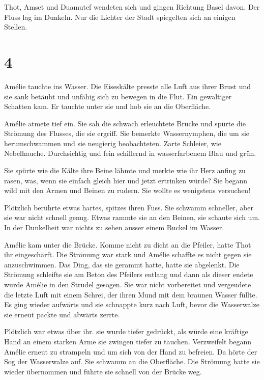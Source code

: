 \documentclass[11pt,titlepage,a5paper]{book}
\begin{document}
Thot, Amset und Duamutef wendeten sich und gingen Richtung Basel davon. Der Fluss lag im Dunkeln. Nur die Lichter der Stadt spiegelten sich an einigen Stellen.

\section*{4}

Amélie tauchte ins Wasser. Die Eiseskälte presste alle Luft aus ihrer Brust und sie sank betäubt und unfähig sich zu bewegen in die Flut. Ein gewaltiger Schatten kam. Er tauchte unter sie und hob sie an die Oberfläche.

Amélie atmete tief ein. Sie sah die schwach erleuchtete Brücke und spürte die Strömung des Flusses, die sie ergriff. Sie bemerkte Wassernymphen, die um sie herumschwammen und sie neugierig beobachteten. Zarte Schleier, wie Nebelhauche. Durchsichtig und fein schillernd in wasserfarbenem Blau und grün. 

Sie spürte wie die Kälte ihre Beine lähmte und merkte wie ihr Herz anfing zu rasen, was, wenn sie einfach gleich hier und jetzt ertrinken würde? Sie begann wild mit den Armen und Beinen zu rudern. Sie wollte es wenigstens versuchen!

Plötzlich berührte etwas hartes, spitzes ihren Fuss. Sie schwamm schneller,  aber sie war nicht schnell genug. Etwas rammte sie an den Beinen, sie schaute sich um. In der Dunkelheit war nichts zu sehen ausser einem Buckel im Wasser.

Amélie kam unter die Brücke. Komme nicht zu dicht an die Pfeiler, hatte Thot ihr eingeschärft. Die Strömung war stark und Amélie schaffte es nicht gegen sie anzuschwimmen. Das Ding, das sie gerammt hatte, hatte sie abgelenkt. Die Strömung schleifte sie am Beton des Pfeilers entlang und dann als dieser endete wurde Amélie in den Strudel gesogen. Sie war nicht vorbereitet und vergeudete die letzte Luft mit einem Schrei, der ihren Mund mit dem braunen Wasser füllte. Es ging wieder aufwärts und sie schnappte kurz nach Luft, bevor die Wasserwalze sie erneut packte und abwärts zerrte.

Plötzlich war etwas über ihr. sie wurde tiefer gedrückt, als würde eine kräftige Hand an einem starken Arme sie zwingen tiefer zu tauchen. Verzweifelt begann Amélie erneut zu strampeln und um sich von der Hand zu befreien. Da hörte der Sog der Wasserwalze auf. Sie schwamm an die Oberfläche. Die Strömung hatte sie wieder übernommen und führte sie schnell von der Brücke weg.
\end{document}
